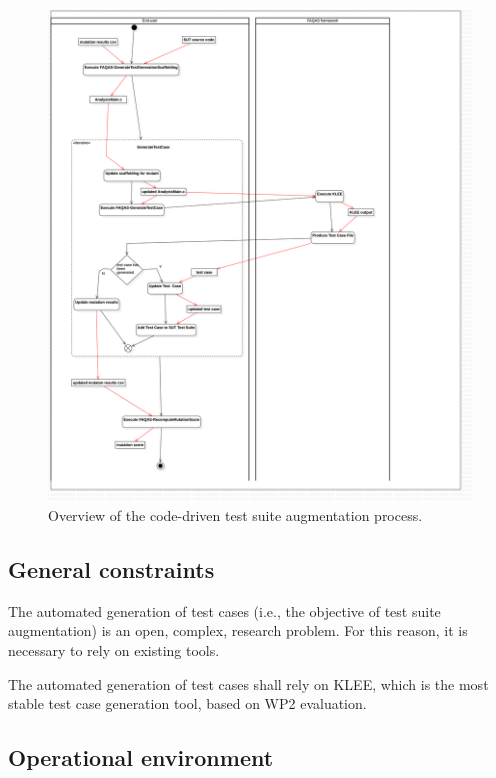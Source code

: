 \begin{figure}[h]
  \centering
	\includegraphics[width=15cm]{images/png/Activity1!CodeDrivenTestSuiteAugmentation_2.png}
      \caption{Overview of the code-driven test suite augmentation process.}
      \label{fig:process:codeDriven:augmentation}
\end{figure}


\clearpage

\subsection{General constraints}

\RQ{} The automated generation of test cases (i.e., the objective of test suite augmentation) is an open, complex, research problem. For this reason, it is necessary to rely on existing tools.

\RQ{} The automated generation of test cases shall rely on KLEE, which is the most stable test case generation tool, based on WP2 evaluation.

\clearpage

\subsection{Operational environment}

